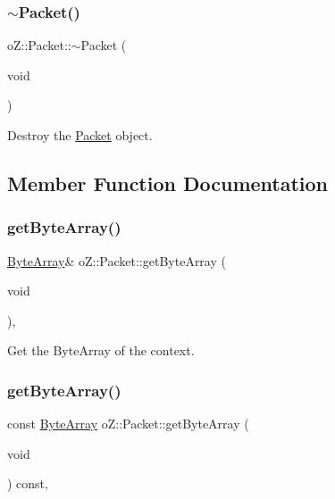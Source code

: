 \subsubsection{\texorpdfstring{$\sim$Packet()}{~Packet()}}
{\footnotesize\ttfamily o\+Z\+::\+Packet\+::$\sim$\+Packet (\begin{DoxyParamCaption}\item[{void}]{ }\end{DoxyParamCaption})\hspace{0.3cm}{\ttfamily [default]}}



Destroy the \mbox{\hyperlink{classo_z_1_1_packet}{Packet}} object. 



\subsection{Member Function Documentation}
\mbox{\label{classo_z_1_1_packet_a8a5d791e4675a3f065928884b64fe7bf}} 
\subsubsection{\texorpdfstring{getByteArray()}{getByteArray()}\hspace{0.1cm}{\footnotesize\ttfamily [1/2]}}
{\footnotesize\ttfamily \mbox{\hyperlink{namespaceo_z_abfa3f5a46e5c7584615dc1dd33fcafb6}{Byte\+Array}}\& o\+Z\+::\+Packet\+::get\+Byte\+Array (\begin{DoxyParamCaption}\item[{void}]{ }\end{DoxyParamCaption})\hspace{0.3cm}{\ttfamily [inline]}, {\ttfamily [noexcept]}}



Get the Byte\+Array of the context. 

\mbox{\label{classo_z_1_1_packet_a4919e1356309ad8c9d7595052d0ca498}} 
\subsubsection{\texorpdfstring{getByteArray()}{getByteArray()}\hspace{0.1cm}{\footnotesize\ttfamily [2/2]}}
{\footnotesize\ttfamily const \mbox{\hyperlink{namespaceo_z_abfa3f5a46e5c7584615dc1dd33fcafb6}{Byte\+Array}} o\+Z\+::\+Packet\+::get\+Byte\+Array (\begin{DoxyParamCaption}\item[{void}]{ }\end{DoxyParamCaption}) const\hspace{0.3cm}{\ttfamily [inline]}, {\ttfamily [noexcept]}}



